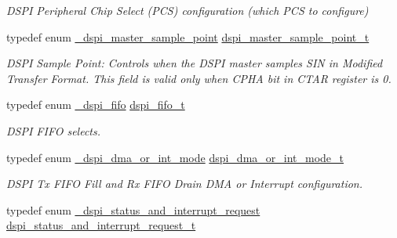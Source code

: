 \begin{DoxyCompactItemize}
\begin{DoxyCompactList}\small\item\em D\+S\+PI Peripheral Chip Select (P\+CS) configuration (which P\+CS to configure) \end{DoxyCompactList}\item 
typedef enum \hyperlink{group__dspi__hal_ga02a53597bff1469f0365b74ad7a20237}{\+\_\+dspi\+\_\+master\+\_\+sample\+\_\+point} \hyperlink{group__dspi__hal_gacbea989c0426eb1d297b286589e453d1}{dspi\+\_\+master\+\_\+sample\+\_\+point\+\_\+t}\hypertarget{group__dspi__hal_gacbea989c0426eb1d297b286589e453d1}{}\label{group__dspi__hal_gacbea989c0426eb1d297b286589e453d1}

\begin{DoxyCompactList}\small\item\em D\+S\+PI Sample Point\+: Controls when the D\+S\+PI master samples S\+IN in Modified Transfer Format. This field is valid only when C\+P\+HA bit in C\+T\+AR register is 0. \end{DoxyCompactList}\item 
typedef enum \hyperlink{group__dspi__hal_gae3f607745b9b2fa245188acbe25877f0}{\+\_\+dspi\+\_\+fifo} \hyperlink{group__dspi__hal_ga4b51d4ff135ca4cb541d18e20b2c0995}{dspi\+\_\+fifo\+\_\+t}\hypertarget{group__dspi__hal_ga4b51d4ff135ca4cb541d18e20b2c0995}{}\label{group__dspi__hal_ga4b51d4ff135ca4cb541d18e20b2c0995}

\begin{DoxyCompactList}\small\item\em D\+S\+PI F\+I\+FO selects. \end{DoxyCompactList}\item 
typedef enum \hyperlink{group__dspi__hal_gabf58af9938cec54ac95d73644f41e5f4}{\+\_\+dspi\+\_\+dma\+\_\+or\+\_\+int\+\_\+mode} \hyperlink{group__dspi__hal_ga8a47ddde41f47a45d797d000b6f5e6f8}{dspi\+\_\+dma\+\_\+or\+\_\+int\+\_\+mode\+\_\+t}\hypertarget{group__dspi__hal_ga8a47ddde41f47a45d797d000b6f5e6f8}{}\label{group__dspi__hal_ga8a47ddde41f47a45d797d000b6f5e6f8}

\begin{DoxyCompactList}\small\item\em D\+S\+PI Tx F\+I\+FO Fill and Rx F\+I\+FO Drain D\+MA or Interrupt configuration. \end{DoxyCompactList}\item 
typedef enum \hyperlink{group__dspi__hal_ga4ceea9e434ef062f9d1a9f34520143a3}{\+\_\+dspi\+\_\+status\+\_\+and\+\_\+interrupt\+\_\+request} \hyperlink{group__dspi__hal_ga59af3ccb7f04892167dc3ddf75cf2696}{dspi\+\_\+status\+\_\+and\+\_\+interrupt\+\_\+request\+\_\+t}\hypertarget{group__dspi__hal_ga59af3ccb7f04892167dc3ddf75cf2696}{}\label{group__dspi__hal_ga59af3ccb7f04892167dc3ddf75cf2696}


\end{DoxyCompactItemize}

